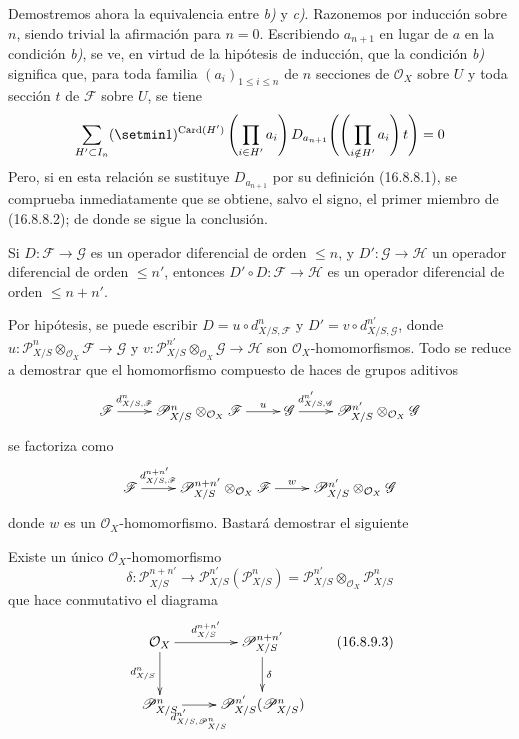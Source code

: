 Demostremos ahora la equivalencia entre \emph{b)} y \emph{c)}. Razonemos por inducción
sobre $n$, siendo trivial la afirmación para $n=0$. Escribiendo $a_{n+1}$ en
lugar de $a$ en la condición \emph{b)}, se ve, en virtud de la hipótesis de
inducción, que la condición \emph{b)} significa que, para toda familia
$(a_i)_{1\leq i\leq n}$ de $n$ secciones de $\mathcal{O}_X$ sobre $U$ y
toda sección $t$ de $\mathscr{F}$ sobre $U$, se tiene
\[
  \sum_{H'\subset I_n}(\setmin 1)^{\operatorname{Card}(H')}
  \left(\prod_{i\in H'}a_i\right)
  D_{a_{n+1}}\!\left(\left(\prod_{i\notin H'}a_i\right)t\right)=0
\]
Pero, si en esta relación se sustituye $D_{a_{n+1}}$ por su definición
(16.8.8.1), se comprueba inmediatamente que se obtiene, salvo el signo, el
primer miembro de (16.8.8.2); de donde se sigue la conclusión.

\begin{proposition}[16.8.9]
\label{IV.16.8.9}
Si $D:\mathscr{F}\to\mathscr{G}$ es un operador diferencial de orden
$\leq n$, y $D':\mathscr{G}\to\mathscr{H}$ un operador diferencial de orden
$\leq n'$, entonces $D'\circ D:\mathscr{F}\to\mathscr{H}$ es un operador
diferencial de orden $\leq n+n'$.
\end{proposition}

Por hipótesis, se puede escribir $D=u\circ d_{X/S,\mathscr{F}}^n$ y
$D'=v\circ d_{X/S,\mathscr{G}}^{n'}$, donde
$u:\mathscr{P}_{X/S}^n\otimes_{\mathcal{O}_X}\mathscr{F}\to\mathscr{G}$ y
$v:\mathscr{P}_{X/S}^{n'}\otimes_{\mathcal{O}_X}\mathscr{G}\to\mathscr{H}$
son $\mathcal{O}_X$-homomorfismos. Todo se reduce a demostrar que el
homomorfismo compuesto de haces de grupos aditivos
\[
  \xymatrix{
    \mathscr{F}\ar[r]^-{d_{X/S,\mathscr{F}}^n}
      &\mathscr{P}_{X/S}^n\otimes_{\mathcal{O}_X}\mathscr{F}
        \ar[r]^-u
      &\mathscr{G}\ar[r]^-{d_{X/S,\mathscr{G}}^{n'}}
      &\mathscr{P}_{X/S}^{n'}\otimes_{\mathcal{O}_X}\mathscr{G}
  }
\]
se factoriza como
\[
  \xymatrix{
    \mathscr{F}\ar[r]^-{d_{X/S,\mathscr{F}}^{n+n'}}
      &\mathscr{P}_{X/S}^{n+n'}\otimes_{\mathcal{O}_X}\mathscr{F}
        \ar[r]^-w
      &\mathscr{P}_{X/S}^{n'}\otimes_{\mathcal{O}_X}\mathscr{G}
  }
\]
donde $w$ es un $\mathcal{O}_X$-homomorfismo. Bastará demostrar el siguiente

\begin{lemma}[16.8.9.1]
\label{IV.16.8.9.1}
Existe un único $\mathcal{O}_X$-homomorfismo
\[
  \delta:\mathscr{P}_{X/S}^{n+n'}
  \longrightarrow
  \mathscr{P}_{X/S}^{n'}(\mathscr{P}_{X/S}^n)
  =\mathscr{P}_{X/S}^{n'}\otimes_{\mathcal{O}_X}\mathscr{P}_{X/S}^n
  \tag{16.8.9.2}
  \label{IV.16.8.9.2}
\]
que hace conmutativo el diagrama
\[
  \xymatrix{
    \mathcal{O}_X\ar[r]^-{d_{X/S}^{n+n'}}\ar[d]_-{d_{X/S}^n}
      &\mathscr{P}_{X/S}^{n+n'}\ar[d]^-\delta\\
    \mathscr{P}_{X/S}^n
      \ar[r]_-{d_{X/S,\mathscr{P}_{X/S}^n}^{n'}}
      &\mathscr{P}_{X/S}^{n'}(\mathscr{P}_{X/S}^n)
  }
  \tag{16.8.9.3}
  \label{IV.16.8.9.3}
\]
\end{lemma}

